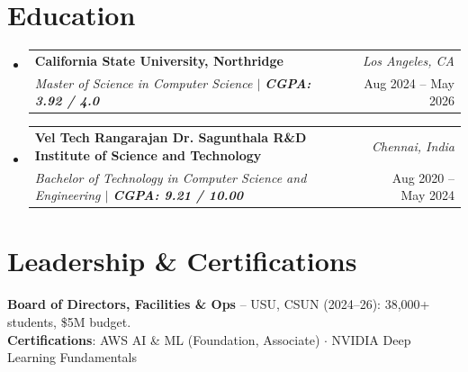\documentclass[a4paper,10pt]{article}
\makeatletter
\newcommand{\resumeSubheading}[4]{
\vspace{0.5mm}\item
    \begin{tabular*}{0.98\textwidth}[t]{l@{\extracolsep{\fill}}r}
        \textbf{#1} & \textit{\footnotesize{#4}} \\
        \textit{\footnotesize{#3}} &  \footnotesize{#2}\\
    \end{tabular*}
    \vspace{-2.4mm}
}
\newcommand{\resumeSubHeadingListStart}{\begin{itemize}[leftmargin=*,labelsep=0mm]}
\newcommand{\resumeSubHeadingListEnd}{\end{itemize}\vspace{0mm}}
\newcommand{\sectionsep}{-10pt}
\makeatother
\begin{document}
\vspace{\sectionsep}
\section{\textbf{Education}}
\resumeSubHeadingListStart

\resumeSubheading
  {California State University, Northridge}{Aug 2024 -- May 2026}
  {Master of Science in Computer Science \;$|$\; \textbf{CGPA: 3.92 / 4.0}}{Los Angeles, CA}

\resumeSubheading
  {Vel Tech Rangarajan Dr. Sagunthala R\&D Institute of Science and Technology}{Aug 2020 -- May 2024}
  {Bachelor of Technology in Computer Science and Engineering \;$|$\; \textbf{CGPA: 9.21 / 10.00}}{Chennai, India}

\resumeSubHeadingListEnd

\vspace{\sectionsep}
\section{\textbf{Leadership \& Certifications}}
\begin{itemize}[leftmargin=0.05in, label={}, topsep=0pt, parsep=0pt, partopsep=0pt]
    \small{\item{
     \textbf{Board of Directors, Facilities \& Ops}{ -- USU, CSUN (2024--26): 38,000+ students, \$5M budget.} \\
     \textbf{Certifications}{: AWS AI \& ML (Foundation, Associate) \;$\cdot$\; NVIDIA Deep Learning Fundamentals}
    }}
\end{itemize}

\end{document}
